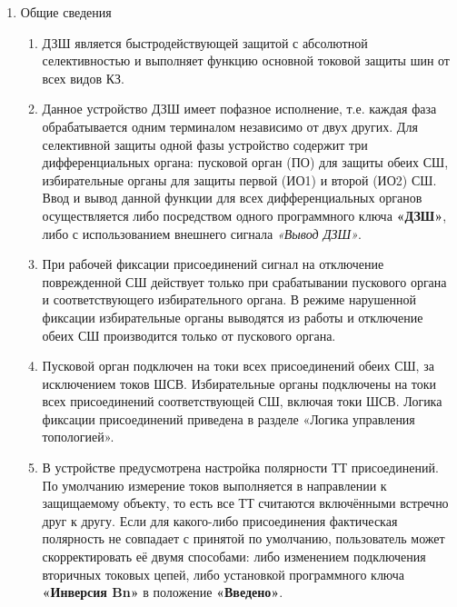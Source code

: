 \color{black}

\begin{enumerate}[label=\arabic{section}.\arabic{subsection}.\arabic{enumi}, labelsep=4pt, leftmargin=0pt, itemindent=57pt, itemsep=0pt, parsep=5pt] %

\item Общие сведения

\begin{enumerate}[label=\arabic{section}.\arabic{subsection}.\arabic{enumi}.\arabic*, labelsep=4pt, leftmargin=0em, itemindent=65pt, parsep=0pt]

\item
ДЗШ является быстродействующей защитой с абсолютной селективностью и выполняет функцию основной токовой защиты шин от всех видов КЗ.

\item
Данное устройство ДЗШ имеет пофазное исполнение, т.е. каждая фаза обрабатывается одним терминалом независимо от двух других.
Для селективной защиты одной фазы устройство содержит три дифференциальных органа: пусковой орган (ПО) для защиты обеих СШ, избирательные органы для защиты первой (ИО1) и второй (ИО2) СШ.
Ввод и вывод данной функции для всех дифференциальных органов осуществляется либо посредством одного программного ключа \textbf{«ДЗШ»}, либо с использованием внешнего сигнала \textit{«Вывод ДЗШ»}.

\item
При рабочей фиксации присоединений сигнал на отключение поврежденной СШ действует только при срабатывании пускового органа и соответствующего избирательного органа.
В режиме нарушенной фиксации избирательные органы выводятся из работы и отключение обеих СШ производится только от пускового органа.

\item
Пусковой орган подключен на токи всех присоединений обеих СШ, за исключением токов ШСВ.
Избирательные органы подключены на токи всех присоединений соответствующей СШ, включая токи ШСВ.
Логика фиксации присоединений приведена в разделе «Логика управления топологией».

\item
В устройстве предусмотрена настройка полярности ТТ присоединений.
По умолчанию измерение токов выполняется в направлении к защищаемому объекту, то есть все ТТ считаются включёнными встречно друг к другу.
Если для какого-либо присоединения фактическая полярность не совпадает с принятой по умолчанию, пользователь может скорректировать её двумя способами: либо изменением подключения вторичных токовых цепей, либо установкой программного ключа \textbf{«Инверсия Bn»} в положение \textbf{«Введено»}.


\end{enumerate}
\end{enumerate}
